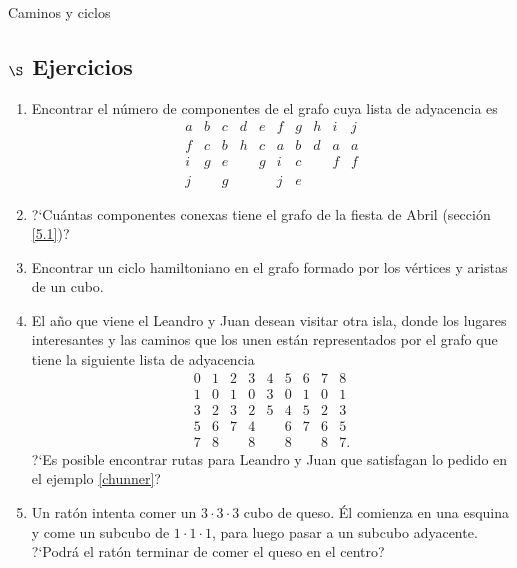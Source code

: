 \begin{section}{Caminos y ciclos}
\begin{observacion}
\end{observacion}

\subsection*{\Large $\S$ Ejercicios}\label{ejercicios5.4}
\begin{enumerate}[1)]
\item Encontrar el número de componentes de el grafo cuya lista de adyacencia es
$$
\begin{matrix}
a&b&c&d&e&f&g&h&i&j\\ \hline
f&c&b&h&c&a&b&d&a&a\\
i&g&e&&g&i&c&&f&f\\
j&&g&&&j&e&&&
\end{matrix}
$$

\item ?`Cuántas componentes conexas tiene el grafo de la fiesta de Abril (sección \ref{5.1})?
\item Encontrar un ciclo hamiltoniano en el grafo formado por los vértices y aristas de un
cubo.
\item El año que viene el Leandro y Juan desean visitar otra isla, donde los lugares interesantes y las caminos que los unen están representados por el grafo que tiene la siguiente lista de adyacencia
$$
\begin{matrix}
0&1&2&3&4&5&6&7&8\\ \hline
1&0&1&0&3&0&1&0&1\\
3&2&3&2&5&4&5&2&3\\
5&6&7&4&&6&7&6&5\\
7&8&&8&&8&&8&7.
\end{matrix}
$$
?`Es posible encontrar rutas para Leandro y Juan que satisfagan lo pedido en el ejemplo \ref{chunner}?
\item Un ratón intenta comer un $3\cdot 3\cdot 3$ cubo de queso. Él comienza en una esquina y come un subcubo de $1\cdot 1\cdot 1$, para luego pasar a un subcubo  adyacente. ?`Podrá el ratón terminar de comer el queso en el centro?
\end{enumerate}

\end{section}



